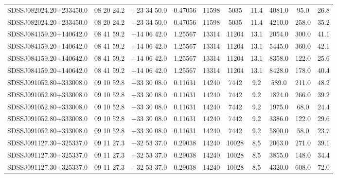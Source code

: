 \begin{landscape}
\begin{center}
\begin{longtable}{l c c c c c c c c c}
SDSSJ082024.20+233450.0  & 08 20 24.2  &         $+$23 34 50.0  &       0.47056  & 11598  &   5035  &       11.4  &      4081.0  &  95.0  &   26.8  \\
SDSSJ082024.20+233450.0  & 08 20 24.2  &         $+$23 34 50.0  &       0.47056  & 11598  &   5035  &       11.4  &      4210.0  &  258.0  &  35.2  \\
SDSSJ084159.20+140642.0  & 08 41 59.2  &         $+$14 06 42.0  &       1.25567  & 13314  &   11204  &      13.1  &      2054.0  &  300.0  &  41.1  \\
SDSSJ084159.20+140642.0  & 08 41 59.2  &         $+$14 06 42.0  &       1.25567  & 13314  &   11204  &      13.1  &      5445.0  &  360.0  &  42.1  \\
SDSSJ084159.20+140642.0  & 08 41 59.2  &         $+$14 06 42.0  &       1.25567  & 13314  &   11204  &      13.1  &      8358.0  &  122.0  &  25.6  \\
SDSSJ084159.20+140642.0  & 08 41 59.2  &         $+$14 06 42.0  &       1.25567  & 13314  &   11204  &      13.1  &      8428.0  &  178.0  &  40.4  \\
SDSSJ091052.80+333008.0  & 09 10 52.8  &         $+$33 30 08.0  &       0.11631  & 14240  &   7442  &       9.2  &       589.0  &   211.0  &  48.2  \\
SDSSJ091052.80+333008.0  & 09 10 52.8  &         $+$33 30 08.0  &       0.11631  & 14240  &   7442  &       9.2  &       1824.0  &  266.0  &  39.2  \\
SDSSJ091052.80+333008.0  & 09 10 52.8  &         $+$33 30 08.0  &       0.11631  & 14240  &   7442  &       9.2  &       1975.0  &  68.0  &   24.4  \\
SDSSJ091052.80+333008.0  & 09 10 52.8  &         $+$33 30 08.0  &       0.11631  & 14240  &   7442  &       9.2  &       3386.0  &  122.0  &  29.6  \\
SDSSJ091052.80+333008.0  & 09 10 52.8  &         $+$33 30 08.0  &       0.11631  & 14240  &   7442  &       9.2  &       5800.0  &  58.0  &   23.7  \\
SDSSJ091127.30+325337.0  & 09 11 27.3  &         $+$32 53 37.0  &       0.29038  & 14240  &   10028  &      8.5  &       2063.0  &  271.0  &  39.1  \\
SDSSJ091127.30+325337.0  & 09 11 27.3  &         $+$32 53 37.0  &       0.29038  & 14240  &   10028  &      8.5  &       3855.0  &  148.0  &  34.4  \\
SDSSJ091127.30+325337.0  & 09 11 27.3  &         $+$32 53 37.0  &       0.29038  & 14240  &   10028  &      8.5  &       4320.0  &  608.0  &  72.0  \\

\end{longtable}
\end{center}
\end{landscape}

